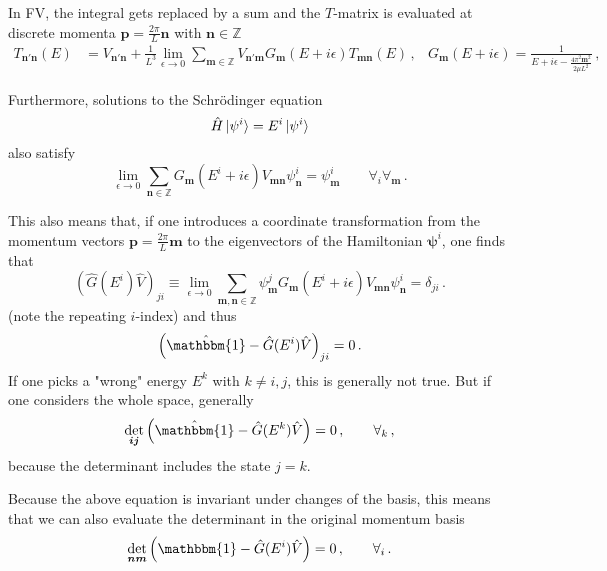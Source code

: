 \documentclass[
    aps,
    prl,
    showkeys,
    nofootinbib,
    floatfix
]{revtex4}
\renewcommand{\vec}[1]{\boldsymbol{#1}}
\begin{document}
In FV, the integral gets replaced by a sum and the $T$-matrix is evaluated at discrete momenta $\vec p = \frac{2 \pi}{L} \vec n$ with $\vec n \in \mathbb Z$
\begin{align}
	T_{\vec n' \vec n}(E)
	&=
	V_{\vec n' \vec n} + \frac{1}{L^3}\lim\limits_{\epsilon \to 0}\sum\limits_{\vec m \in \mathbb Z} V_{\vec n' \vec m} G_{\vec m}( E + i \epsilon) T_{\vec m \vec n}(E) \, ,
	&
	G_{\vec m}(E+ i \epsilon) = \frac{1}{E + i \epsilon - \frac{4 \pi^2 \vec m^2}{2\mu L^2 }}
	\, ,
\end{align}

Furthermore, solutions to the Schrödinger equation
\begin{equation}
	\hat H \ket{\psi^i} = E^i \ket{\psi^i}
\end{equation}
also satisfy
\begin{equation}
	\lim\limits_{\epsilon \to 0}\sum\limits_{\vec n \in \mathbb Z} G_{\vec m}( E^i + i \epsilon) V_{\vec m \vec n} \psi_{\vec n}^i = \psi_{\vec m}^i \qquad \forall _i \forall _{\vec{m}} \, .
\end{equation}

This also means that, if one introduces a coordinate transformation from the momentum vectors $\vec p = \frac{2 \pi}{L} \vec m$ to the eigenvectors of the Hamiltonian $\vec \psi^i$, one finds that
\begin{equation}
	\left(\hat G(E^i) \hat V\right)_{ji}
	\equiv \lim\limits_{\epsilon \to 0}
	\sum\limits_{\vec m, \vec n \in \mathbb Z} \psi_{\vec m}^j G_{\vec m}( E^i + i \epsilon) V_{\vec m \vec n} \psi_{\vec n}^i
	=
	\delta_{ji}\, .
\end{equation}
(note the repeating $i$-index) and thus
\begin{equation}
	\left(\hat{\mathbbm{1}} - \hat G( E^i ) \hat V\right)_{j i} = 0 \, .
\end{equation}
If one picks a "wrong" energy $E^k$  with $k \neq i, j$, this is generally not true.
But if one considers the whole space, generally
\begin{equation}
	\det\limits_{\vec i \vec j} \left(\hat{\mathbbm{1}} - \hat G( E^k ) \hat V\right) = 0 \, , \qquad \forall_k \, ,
\end{equation}
because the determinant includes the state $j = k$.

Because the above equation is invariant under changes of the basis, this means that we can also evaluate the determinant in the original momentum basis
\begin{equation}
	\det\limits_{\vec n \vec m} \left({\mathbbm{1}} - \hat G( E^i ) \hat V\right) = 0 \, , \qquad \forall_i \, .
\end{equation}
\end{document}
